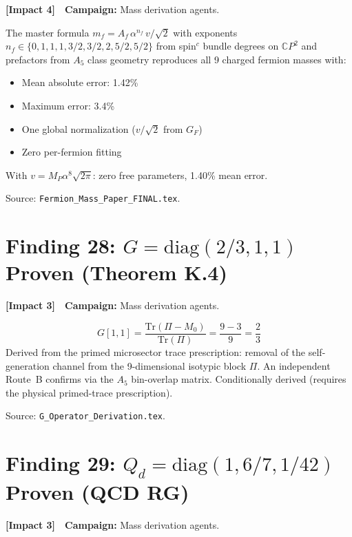 \documentclass[11pt,a4paper]{article}
\newcommand{\impactfour}{\textcolor{impact4}{\textbf{[Impact 4]}}}
\newcommand{\impactthree}{\textcolor{impact3}{\textbf{[Impact 3]}}}
\newcommand{\CP}{\mathbb{C}P}
\newcommand{\Tr}{\mathrm{Tr}}
\begin{document}
\impactfour\ \ \textbf{Campaign:} Mass derivation agents.

The master formula $m_f = A_f\,\alpha^{n_f}\,v/\sqrt{2}$ with exponents
$n_f \in \{0, 1, 1, 1, 3/2, 3/2, 2, 5/2, 5/2\}$ from spin$^c$ bundle
degrees on $\CP^2$ and prefactors from $A_5$ class geometry reproduces
all 9 charged fermion masses with:
\begin{itemize}[nosep]
\item Mean absolute error: 1.42\%
\item Maximum error: 3.4\%
\item One global normalization ($v/\sqrt{2}$ from $G_F$)
\item Zero per-fermion fitting
\end{itemize}
With $v = M_P\alpha^8\sqrt{2\pi}$: zero free parameters, 1.40\% mean error.

Source: \texttt{Fermion\_Mass\_Paper\_FINAL.tex}.


\section{Finding 28: $G = \mathrm{diag}(2/3, 1, 1)$ Proven (Theorem K.4)}
\label{sec:G-operator}

\impactthree\ \ \textbf{Campaign:} Mass derivation agents.

\begin{equation}
G[1,1] = \frac{\Tr(\Pi - M_0)}{\Tr(\Pi)} = \frac{9-3}{9} = \frac{2}{3}
\end{equation}
Derived from the primed microsector trace prescription: removal of the
self-generation channel from the 9-dimensional isotypic block $\Pi$.
An independent Route~B confirms via the $A_5$ bin-overlap matrix.
Conditionally derived (requires the physical primed-trace prescription).

Source: \texttt{G\_Operator\_Derivation.tex}.


\section{Finding 29: $Q_d = \mathrm{diag}(1, 6/7, 1/42)$ Proven (QCD RG)}
\label{sec:Qd}

\impactthree\ \ \textbf{Campaign:} Mass derivation agents.
\end{document}
